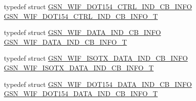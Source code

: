 \begin{DoxyCompactItemize}
\item 
typedef struct \hyperlink{a00335}{GSN\_\-WIF\_\-DOT154\_\-CTRL\_\-IND\_\-CB\_\-INFO} \hyperlink{a00608_aacaf9d08bea1dd5c0df13e784da9937b}{GSN\_\-WIF\_\-DOT154\_\-CTRL\_\-IND\_\-CB\_\-INFO\_\-T}
\item 
typedef struct \hyperlink{a00324}{GSN\_\-WIF\_\-DATA\_\-IND\_\-CB\_\-INFO} \hyperlink{a00608_a7a4ae2bf745d0f7890ec50466bc92bea}{GSN\_\-WIF\_\-DATA\_\-IND\_\-CB\_\-INFO\_\-T}
\item 
typedef struct \hyperlink{a00340}{GSN\_\-WIF\_\-ISOTX\_\-DATA\_\-IND\_\-CB\_\-INFO} \hyperlink{a00608_abd9c83e04e6af53c5504eafe3fef5c0f}{GSN\_\-WIF\_\-ISOTX\_\-DATA\_\-IND\_\-CB\_\-INFO\_\-T}
\item 
typedef struct \hyperlink{a00336}{GSN\_\-WIF\_\-DOT154\_\-DATA\_\-IND\_\-CB\_\-INFO} \hyperlink{a00608_af7274d9e47e626c3fd7b655a5aecd3f0}{GSN\_\-WIF\_\-DOT154\_\-DATA\_\-IND\_\-CB\_\-INFO\_\-T}
\end{DoxyCompactItemize}
